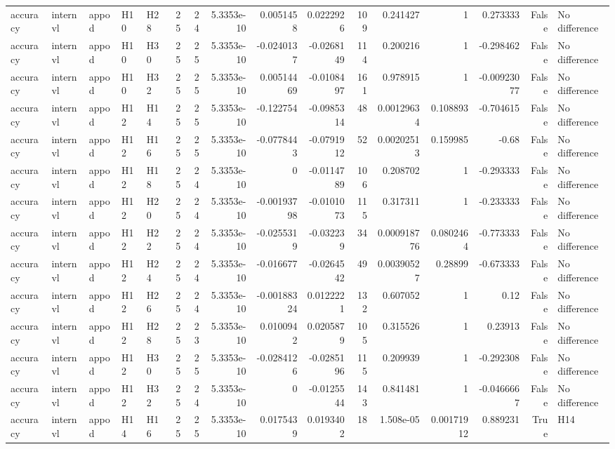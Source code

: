 \begin{longtable}{lllllrrrrrrrrrrl}
accuracy & internvl & appod & H10 & H28 & 25 & 24 & 5.3353e-10 & 0.0051458 & 0.0222926 & 109 & 0.241427 & 1 & 0.273333 & False & No difference \\
accuracy & internvl & appod & H10 & H30 & 25 & 25 & 5.3353e-10 & -0.0240137 & -0.0268149 & 114 & 0.200216 & 1 & -0.298462 & False & No difference \\
accuracy & internvl & appod & H10 & H32 & 25 & 25 & 5.3353e-10 & 0.00514469 & -0.0108497 & 161 & 0.978915 & 1 & -0.00923077 & False & No difference \\
accuracy & internvl & appod & H12 & H14 & 25 & 25 & 5.3353e-10 & -0.122754 & -0.0985314 & 48 & 0.00129634 & 0.108893 & -0.704615 & False & No difference \\
accuracy & internvl & appod & H12 & H16 & 25 & 25 & 5.3353e-10 & -0.0778443 & -0.0791912 & 52 & 0.00202513 & 0.159985 & -0.68 & False & No difference \\
accuracy & internvl & appod & H12 & H18 & 25 & 24 & 5.3353e-10 & 0 & -0.0114789 & 106 & 0.208702 & 1 & -0.293333 & False & No difference \\
accuracy & internvl & appod & H12 & H20 & 25 & 24 & 5.3353e-10 & -0.00193798 & -0.0101073 & 115 & 0.317311 & 1 & -0.233333 & False & No difference \\
accuracy & internvl & appod & H12 & H22 & 25 & 24 & 5.3353e-10 & -0.0255319 & -0.032239 & 34 & 0.000918776 & 0.0802464 & -0.773333 & False & No difference \\
accuracy & internvl & appod & H12 & H24 & 25 & 24 & 5.3353e-10 & -0.016677 & -0.0264542 & 49 & 0.00390527 & 0.28899 & -0.673333 & False & No difference \\
accuracy & internvl & appod & H12 & H26 & 25 & 24 & 5.3353e-10 & -0.00188324 & 0.0122221 & 132 & 0.607052 & 1 & 0.12 & False & No difference \\
accuracy & internvl & appod & H12 & H28 & 25 & 23 & 5.3353e-10 & 0.0100942 & 0.0205879 & 105 & 0.315526 & 1 & 0.23913 & False & No difference \\
accuracy & internvl & appod & H12 & H30 & 25 & 25 & 5.3353e-10 & -0.0284126 & -0.0285196 & 115 & 0.209939 & 1 & -0.292308 & False & No difference \\
accuracy & internvl & appod & H12 & H32 & 25 & 24 & 5.3353e-10 & 0 & -0.0125544 & 143 & 0.841481 & 1 & -0.0466667 & False & No difference \\
accuracy & internvl & appod & H14 & H16 & 25 & 25 & 5.3353e-10 & 0.0175439 & 0.0193402 & 18 & 1.508e-05 & 0.00171912 & 0.889231 & True & H14 \\

\end{longtable}
